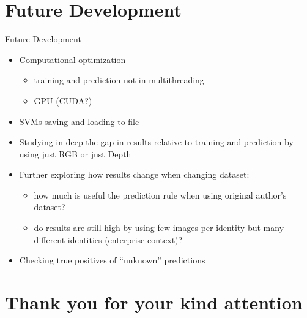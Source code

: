 \documentclass[unknownkeysallowed]{beamer}
\begin{document}
\section{Future Development}
\begin{frame}{Future Development}
	\begin{itemize}
		\item Computational optimization
			\begin{itemize}
				\item training and prediction not in
					multithreading
				\item GPU (CUDA?)
			\end{itemize}
		\item SVMs saving and loading to file
		\item Studying in deep the gap in results relative to training
			and prediction by using just RGB or just Depth
		\item Further exploring how results change when changing
			dataset:
			\begin{itemize}
				\item how much is useful the prediction rule
					when
					using original author's dataset?
				\item do results are still high by using few
					images per identity but many different
					identities (enterprise context)?
			\end{itemize}
		\item Checking true positives of ``unknown''
			predictions

	\end{itemize}
\end{frame}

\section*{Thank you for your kind attention}
\end{document}

